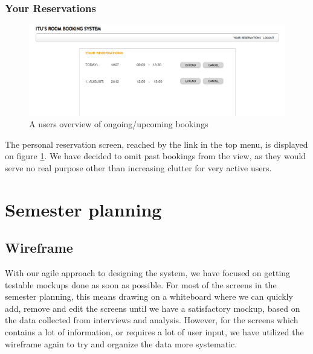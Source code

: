 \subsubsection*{Your Reservations}
\begin{figure}[htb]
\begin{center}
\leavevmode
\includegraphics[width=1\textwidth]{images/reservations}
\end{center}
\caption{A users overview of ongoing/upcoming bookings}
\label{fig:reservations}
\end{figure}
The personal reservation screen, reached by the link in the top menu, is displayed on figure \ref{fig:reservations}. We have decided to omit past bookings from the view, as they would serve no real purpose other than increasing clutter for very active users.

\section{Semester planning}
\label{sec:semester_planning_ui}
\subsection{Wireframe}
\label{subsec:wire_sem}
With our agile approach to designing the system, we have focused on getting testable mockups done as soon as possible. For most of the screens in the semester planning, this means drawing on a whiteboard where we can quickly add, remove and edit the screens until we have a satisfactory mockup, based on the data collected from interviews and analysis. However, for the screens which contains a lot of information, or requires a lot of user input, we have utilized the wireframe again to try and organize the data more systematic.

